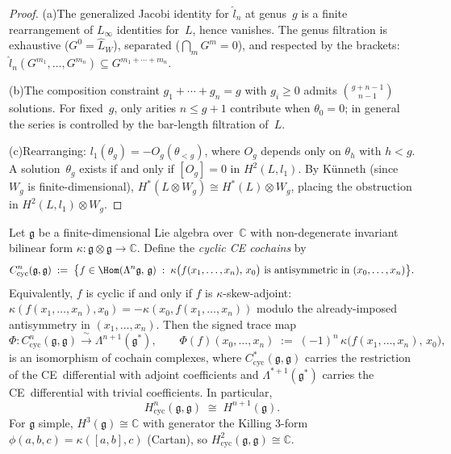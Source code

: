 \begin{proof}
(a)\enspace The generalized Jacobi identity for $\hat{l}_n$ at
genus~$g$ is a finite rearrangement of $L_\infty$ identities
for~$L$, hence vanishes.  The genus filtration is exhaustive
($G^0 = \widehat{L}_W$), separated ($\bigcap_m G^m = 0$), and
respected by the brackets:
$\hat{l}_n(G^{m_1}, \ldots, G^{m_n}) \subseteq
G^{m_1 + \cdots + m_n}$.

(b)\enspace The composition constraint
$g_1 + \cdots + g_n = g$ with $g_i \geq 0$ admits
$\binom{g + n - 1}{n - 1}$ solutions.  For fixed~$g$, only
arities $n \leq g + 1$ contribute when $\theta_0 = 0$; in
general the series is controlled by the bar-length filtration
of~$L$.

(c)\enspace Rearranging: $l_1(\theta_g) = -O_g(\theta_{<g})$,
where $O_g$ depends only on $\theta_h$ with $h < g$.  A
solution~$\theta_g$ exists if and only if $[O_g] = 0$ in
$H^2(L, l_1)$.  By K\"unneth (since $W_g$ is
finite-dimensional),
$H^*(L \otimes W_g) \cong H^*(L) \otimes W_g$, placing the
obstruction in $H^2(L, l_1) \otimes W_g$.
\end{proof}

\begin{proposition}\label{prop:cyclic-ce-identification}
Let $\mathfrak{g}$ be a finite-dimensional Lie algebra
over~$\mathbb{C}$ with non-degenerate invariant bilinear form
$\kappa\colon \mathfrak{g}\otimes\mathfrak{g}\to\mathbb{C}$.
Define the \emph{cyclic CE cochains} by
\[
C^n_{\mathrm{cyc}}(\mathfrak{g},\mathfrak{g})
\;:=\;
\bigl\{f\in \Hom(\Lambda^n\mathfrak{g},\,\mathfrak{g})\;:\;
\kappa\bigl(f(x_1,\ldots,x_n),\,x_0\bigr)
\text{ is antisymmetric in }(x_0,\ldots,x_n)
\bigr\}.
\]
Equivalently, $f$ is cyclic if and only if $f$ is
$\kappa$-skew-adjoint: $\kappa(f(x_1,\ldots,x_n), x_0)
= -\kappa(x_0, f(x_1,\ldots,x_n))$ modulo the already-imposed
antisymmetry in $(x_1,\ldots,x_n)$.  Then the signed trace map
\begin{equation}\label{eq:cyclic-ce-trace-map}
\Phi\colon C^n_{\mathrm{cyc}}(\mathfrak{g},\mathfrak{g})
\xrightarrow{\;\sim\;}
\Lambda^{n+1}(\mathfrak{g}^*),
\qquad
\Phi(f)(x_0,\ldots,x_n)
\;:=\;
(-1)^n\,\kappa\bigl(f(x_1,\ldots,x_n),\,x_0\bigr),
\end{equation}
is an isomorphism of cochain complexes, where
$C^*_{\mathrm{cyc}}(\mathfrak{g},\mathfrak{g})$ carries the
restriction of the CE~differential with adjoint coefficients
and $\Lambda^{*+1}(\mathfrak{g}^*)$ carries the CE~differential
with trivial coefficients.  In particular,
\[
H^n_{\mathrm{cyc}}(\mathfrak{g},\mathfrak{g})
\;\cong\;
H^{n+1}(\mathfrak{g}).
\]
For $\mathfrak{g}$ simple,
$H^3(\mathfrak{g})\cong\mathbb{C}$ with generator the Killing
$3$-form $\phi(a,b,c)=\kappa([a,b],c)$
\textup{(}Cartan\textup{)}, so
$H^2_{\mathrm{cyc}}(\mathfrak{g},\mathfrak{g})\cong\mathbb{C}$.
\end{proposition}


